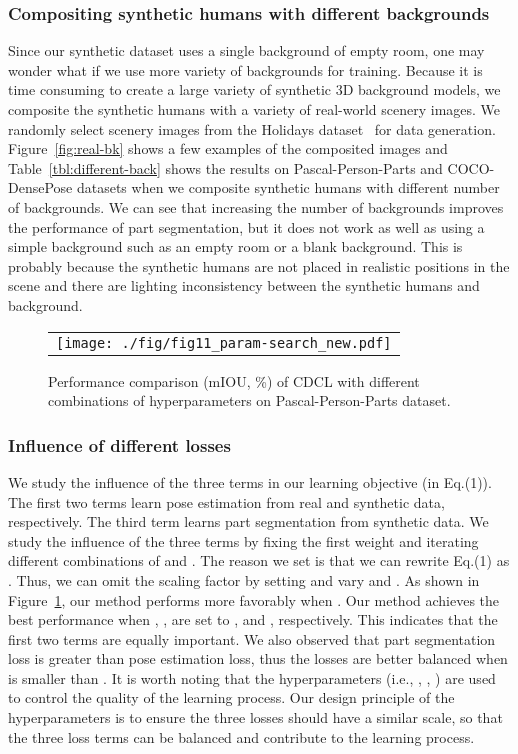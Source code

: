 \documentclass[final]{IEEEtran}
\begin{document}
{\begin{minipage}{\textwidth}
\subsubsection{\textbf{Compositing synthetic humans with different backgrounds}}
Since our synthetic dataset uses a single background of empty room, one may wonder what if we use more variety of backgrounds for training. Because it is time consuming to create a large variety of synthetic 3D background models, we composite the synthetic humans with a variety of real-world scenery images. We randomly select  scenery images from the Holidays dataset~\cite{jegou2008hamming} for data generation. Figure~\ref{fig:real-bk} shows a few examples of the composited images and Table~\ref{tbl:different-back} shows the results on Pascal-Person-Parts and COCO-DensePose datasets when we composite synthetic humans with different number of backgrounds. We can see that increasing the number of backgrounds improves the performance of part segmentation, but it does not work as well as using a simple background such as an empty room or a blank background. This is probably because the synthetic humans are not placed in realistic positions in the scene and there are lighting inconsistency between the synthetic humans and background. 
 
\begin{figure}
	 \centering
\setlength{\tabcolsep}{1pt}
 \begin{tabular}{c}
 	\texttt{[image: ./fig/fig11\_param-search\_new.pdf]}
    \end{tabular}
	\caption{Performance comparison (mIOU, \%) of CDCL with different combinations of hyperparameters on Pascal-Person-Parts dataset.}
\label{fig:param-search}
\end{figure}

\subsubsection{\textbf{Influence of different losses}}
\label{sec:hyerparam}
We study the influence of the three terms in our learning objective (in Eq.(1)). The first two terms learn pose estimation from real and synthetic data, respectively. The third term learns part segmentation from synthetic data. We study the influence of the three terms by fixing the first weight  and iterating different combinations of  and . The reason we set  is that we can rewrite Eq.(1) as . Thus, we can omit the scaling factor by setting  and vary  and . As shown in Figure~\ref{fig:param-search}, our method performs more favorably when . Our method achieves the best performance when , ,  are set to ,  and , respectively. This indicates that the first two terms are equally important. We also observed that part segmentation loss is greater than pose estimation loss, thus the losses are better balanced when  is smaller than . It is worth noting that the hyperparameters (i.e., , , ) are used to control the quality of the learning process. Our design principle of the hyperparameters is to ensure the three losses should have a similar scale, so that the three loss terms can be balanced and contribute to the learning process.




\end{minipage}}
\end{document}

